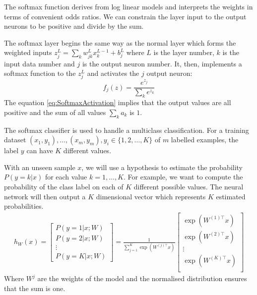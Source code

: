 The softmax function derives from log linear models and interprets the weights in terms of convenient odds ratios. We can constrain the layer input to the output neurons to be positive and divide by the sum.

The softmax layer begins the same way as the normal layer which forms the weighted inputs $z^L_j = \sum_{k} w^L_{jk} x^{L-1}_k + b^L_j$ where $L$ is the layer number, $k$ is the input data number and $j$ is the output neuron number. It, then, implements a softmax function to the $z^L_j$ and activates the $j$ output neuron:
\begin{equation}\label{eq:SoftmaxActivation}
f_j(z) = \frac{e^{z_j}}{\sum_k e^{z_k}}
\end{equation}
The equation \ref{eq:SoftmaxActivation} implies that the output values are all positive and the sum of all values $\sum_k a_k$ is $1$.

The softmax classifier is used to handle a multiclass classification. For a training dataset $(x_{1}, y_{1}), \ldots, (x_{m}, y_{m}), y_{i} \in \{1, 2, \ldots, K\} $ of $m$ labelled examples, the label $y$ can have $K$ different values.

With an unseen sample $x$, we will use a hypothesis to estimate the probability $P(y=k | x)$ for each value $k = 1, \ldots, K$. For example, we want to compute the probability of the class label on each of $K$ different possible values. The neural network will then output a $K$ dimensional vector which represents $K$ estimated probabilities. 
\begin{align}
h_{W}(x) =
\begin{bmatrix}
P(y = 1 | x; W) \\
P(y = 2 | x; W) \\
\vdots \\
P(y = K | x; W)
\end{bmatrix}
=
\frac{1}{ \sum_{j=1}^{K}{\exp(W^{(j)\top} x) }}
\begin{bmatrix}
\exp(W^{(1)\top} x ) \\
\exp(W^{(2)\top} x ) \\
\vdots \\
\exp(W^{(K)\top} x ) \\
\end{bmatrix}
\end{align}
Where $W^{j}$ are the weights of the model and the normalised distribution ensures that the sum is one.

